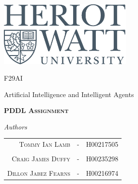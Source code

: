 \documentclass[11pt, oneside]{article}   	%
\title{}
\author{}
\begin{document}
\begin{titlepage}
	  \thispagestyle{empty}
	
	{\centering
		
					
		
		\includegraphics[width=0.5\textwidth]{hw.png}\par\vspace{1cm}
		
		\vspace{1cm}
		
		{\LARGE F29AI \par}
		
		{\LARGE Artificial Intelligence and Intelligent Agents \par}
		
		\vspace{1.5cm}
		
		\vspace{1.5cm}
		
		{\scshape\LARGE\bfseries PDDL Assignment \par}
		
		\vspace{5cm}
		
					
		
		\textit{Authors}\par
		
		\begin{tabular}{rcl}
			
			  \\ \textsc{Tommy Ian Lamb} & - & H00217505\\
			
			\\ \textsc{Craig James Duffy} & - &  H00235298\\
						  \\ \textsc{Dillon Jabez Fearns} & - & H00216974
\\

			
		\end{tabular} \\		
		
	}
	
\end{titlepage}

\pagebreak
\end{document}
